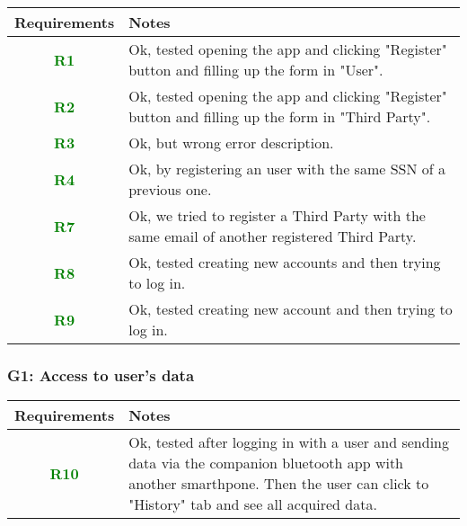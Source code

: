   \begin{adjustwidth}{1cm}{}
        \begin{longtable}{|c|p{}|}
            \hline
            \textbf{Requirements} & \textbf{Notes} \\
            \hline
            \textbf{\textcolor{green}{R1}} & Ok, tested opening the app and clicking "Register" button and filling up the form in "User". \\
            \hline
            \textbf{\textcolor{green}{R2}} & Ok, tested opening the app and clicking "Register" button and filling up the form in "Third Party".   \\
            \hline
            \textbf{\textcolor{green}{R3}} & Ok, but wrong error description.  \\
                    \hline
            \textbf{\textcolor{green}{R4}} & Ok, by registering an user with the same SSN of a previous one. \\
                        \hline
            \textbf{\textcolor{green}{R7}} & Ok, we tried to register a Third Party with the same email of another registered Third Party.  \\
                        \hline
            \textbf{\textcolor{green}{R8}} & Ok, tested creating new accounts and then trying to log in. \\
                        \hline
            \textbf{\textcolor{green}{R9}} & Ok, tested creating new account and then trying to log in.\\
                        \hline

        \end{longtable}
    \end{adjustwidth}

\subsubsection{G1: Access to user's data}
  \begin{adjustwidth}{1cm}{}
        \begin{longtable}{|c|p{}|}
            \hline
            \textbf{Requirements} & \textbf{Notes} \\
            \hline
            \textbf{\textcolor{green}{R10}} & Ok, tested after logging in with a user and sending data via the companion bluetooth app with another smarthpone. Then the user can click to "History" tab and see all acquired data.  \\
            \hline
        
        \end{longtable}
    \end{adjustwidth}
    
